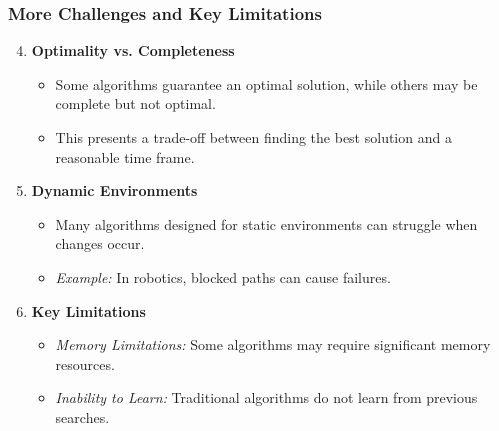 \documentclass[aspectratio=169]{beamer}
\begin{document}
\begin{frame}[fragile]
    \frametitle{More Challenges and Key Limitations}
    \begin{enumerate}
        \setcounter{enumi}{3}
        \item \textbf{Optimality vs. Completeness}
        \begin{itemize}
            \item Some algorithms guarantee an optimal solution, while others may be complete but not optimal.
            \item This presents a trade-off between finding the best solution and a reasonable time frame.
        \end{itemize}
        
        \item \textbf{Dynamic Environments}
        \begin{itemize}
            \item Many algorithms designed for static environments can struggle when changes occur.
            \item \textit{Example:} In robotics, blocked paths can cause failures.
        \end{itemize}
        
        \item \textbf{Key Limitations}
        \begin{itemize}
            \item \textit{Memory Limitations:} Some algorithms may require significant memory resources.
            \item \textit{Inability to Learn:} Traditional algorithms do not learn from previous searches.
        \end{itemize}
    \end{enumerate}
\end{frame}
\end{document}
